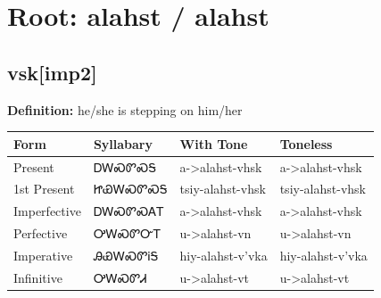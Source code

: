 \documentclass{article}%
\begin{document}
%
\normalsize%
\section*{Root: alahst / alahst}%
\subsection*{vsk[imp2]}%
\textbf{Definition: }%
he/she is stepping on him/her%
\\[0.5em]%
\begin{tabular}{|l|l|l|l|}%
\hline%
\textbf{Form}&\textbf{Syllabary}&\textbf{With Tone}&\textbf{Toneless}\\%
\hline%
Present&ᎠᎳᏍᏛᏍᎦ&a{-}>alahst{-}vhsk&a{-}>alahst{-}vhsk\\%
1st Present&ᏥᏯᎳᏍᏛᏍᎦ&tsiy{-}alahst{-}vhsk&tsiy{-}alahst{-}vhsk\\%
Imperfective&ᎠᎳᏍᏛᏍᎪᎢ&a{-}>alahst{-}vhsk&a{-}>alahst{-}vhsk\\%
Perfective&ᎤᎳᏍᏛᏅᎢ&u{-}>alahst{-}vn&u{-}>alahst{-}vn\\%
Imperative&ᎯᏯᎳᏍᏛᎥᎦ&hiy{-}alahst{-}v'vka&hiy{-}alahst{-}v'vka\\%
Infinitive&ᎤᎳᏍᏛᏗ&u{-}>alahst{-}vt&u{-}>alahst{-}vt\\%
\hline%
\end{tabular}%
\\[1em]%
\end{document}
